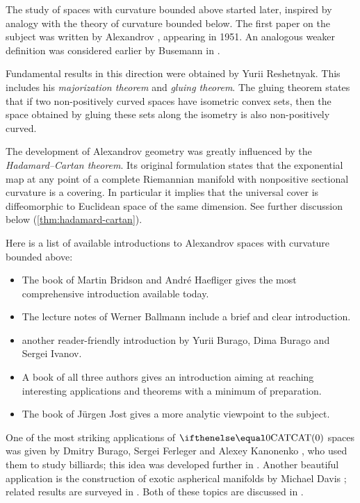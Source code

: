 The study of  spaces with curvature bounded above started later,
inspired by analogy with the theory of curvature bounded below.
The first paper on the subject was written by Alexandrov \cite{alexandrov:strong-angle}, appearing in 1951.
An analogous weaker definition was considered earlier by Busemann in \cite{busemann-CBA}.

Fundamental results in this direction were obtained by Yurii Reshetnyak.
This includes his \emph{majorization theorem} and \emph{gluing theorem}.
The gluing theorem states that if two non-positively curved spaces have isometric convex sets, then the space obtained by gluing these sets along the isometry is also non-positively curved.

The development of Alexandrov geometry was greatly influenced by the \emph{Hadamard--Cartan theorem}.
Its original formulation states that the exponential map at any point of a complete Riemannian manifold with nonpositive sectional curvature is a covering.
In particular it implies that the universal cover is diffeomorphic to Euclidean space of the same dimension. 
See further discussion below (\ref{thm:hadamard-cartan}).

Here is a list of available introductions to Alexandrov spaces with curvature bounded above: 
\begin{itemize}
\item The book of Martin Bridson and Andr\'e Haefliger \cite{bridson-haefliger} gives the most comprehensive introduction available today. 
\item The lecture notes of Werner Ballmann \cite{ballmann:lectures} include a brief 
and clear
introduction.
\item \cite[Chapter 9]{burago-burago-ivanov} another reader-friendly introduction by Yurii Burago, Dima Burago and Sergei Ivanov.
\item A book of all three authors \cite{alexander-kapovitch-petrunin-CAT} gives an introduction aiming at reaching interesting applications and theorems with a minimum of preparation.
\item The book of J\"{u}rgen Jost \cite{jost} gives a more analytic viewpoint to the subject.
\end{itemize}

One of the most striking applications of $\CAT0$ spaces was given by Dmitry Burago, Sergei Ferleger and Alexey Kanonenko \cite{burago-ferleger-kononenko1998-1},
who used them to study billiards; this idea was developed further in \cite{burago-ferleger-kononenko1998-2,burago-ferleger-kononenko1998-3,burago-ferleger-kononenko1998-4,burago-ferleger-kononenko2000,burago-ferleger-kononenko2001}. 
Another beautiful application is the construction of exotic aspherical manifolds by Michael Davis \cite{davis:aspherical}; related results are surveyed in \cite{davis:exotic,charney-davis}.
Both of these topics are discussed in \cite{alexander-kapovitch-petrunin-CAT}.

